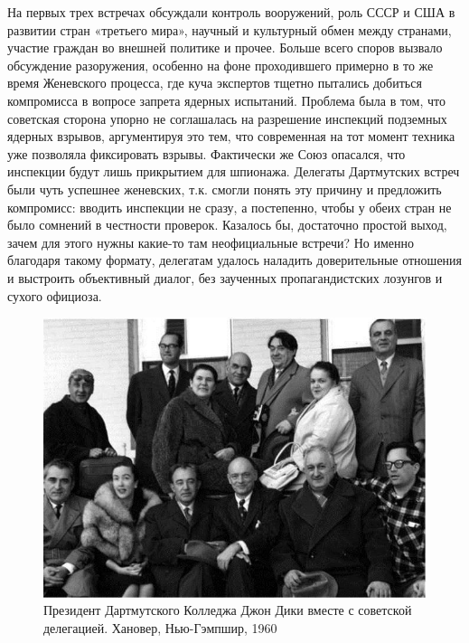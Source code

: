 На первых трех встречах обсуждали контроль вооружений, роль СССР и США в развитии стран «третьего мира», научный и культурный обмен между странами, участие граждан во внешней политике и прочее. Больше всего споров вызвало обсуждение разоружения, особенно на фоне проходившего примерно в то же время Женевского процесса, где куча экспертов тщетно пытались добиться компромисса в вопросе запрета ядерных испытаний. Проблема была в том, что советская сторона упорно не соглашалась на разрешение инспекций подземных ядерных взрывов, аргументируя это тем, что современная на тот момент техника уже позволяла фиксировать взрывы. Фактически же Союз опасался, что инспекции будут лишь прикрытием для шпионажа. Делегаты Дартмутских встреч были чуть успешнее женевских, т.к. смогли понять эту причину и предложить компромисс: вводить инспекции не сразу, а постепенно, чтобы у обеих стран не было сомнений в честности проверок. Казалось бы, достаточно простой выход, зачем для этого нужны какие-то там неофициальные встречи? Но именно благодаря такому формату, делегатам удалось наладить доверительные отношения и выстроить объективный диалог, без заученных пропагандистских лозунгов и сухого официоза.
\begin{figure}[h!tb] 
	\centering\includegraphics[scale=0.5]{Dartmud/-6ky6zoSgDI.jpg}
	\caption{Президент Дартмутского Колледжа Джон Дики вместе с советской делегацией. Хановер, Нью-Гэмпшир, 1960 }%
\end{figure}
